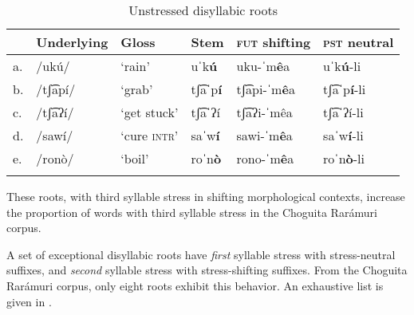 \begin{table}
\caption{Unstressed disyllabic roots}
\label{tab:unstressed-disyllabic}

\begin{tabularx}{\textwidth}{lXXXXl}
\lsptoprule
&\textbf{Underlying} & \textbf{Gloss} & \textbf{Stem} & \textbf{\textsc{fut} shifting} & \textbf{\textsc{pst} neutral} \\
\midrule
a.& /ukú/  &  ‘rain’   &  uˈk\textbf{ú}  & uku-ˈm\textbf{ê}a    &     uˈk\textbf{ú}-li  \\
b.& /tʃ͡apí/ &  ‘grab’ &  tʃ͡aˈp\textbf{í} &  tʃ͡api-ˈm\textbf{ê}a &   tʃ͡aˈp\textbf{í}{}-li\\
c.& /tʃ͡aʔí/& 	‘get stuck' &	tʃ͡aˈʔí &	tʃ͡aʔi-ˈmêa	& tʃ͡aˈʔí-li\\
d.& /sawí/  & ‘cure \textsc{intr}’ & saˈw\textbf{í}   & sawi-ˈm\textbf{ê}a & saˈw\textbf{í}-li  \\
e.& /ronò/  & ‘boil’ &  roˈn\textbf{ò}  & rono-ˈm\textbf{ê}a        & roˈn\textbf{ò}{}-li   \\
\lspbottomrule
\end{tabularx}
\end{table}

These roots, with third syllable stress in shifting morphological contexts, increase the proportion of words with third syllable stress in the Choguita Rarámuri corpus.

A set of exceptional disyllabic roots have \textit{first} syllable stress with stress-neutral suffixes, and \textit{second} syllable stress with stress-shifting suffixes. From the Choguita Rarámuri corpus, only eight roots exhibit this behavior. An exhaustive list is given in .

